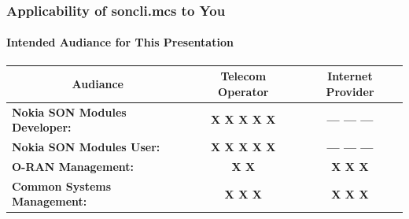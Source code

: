 \begin{whenOrg}
\begin{verblatex}

\begin{frame}[fragile,plain,label=intendedAudiance]
    \frametitle{Applicability of soncli.mcs to You}
    \framesubtitle{Intended Audiance for This Presentation}

\begin{small}
\begin{tabular}{|p{1in}|p{3in}|p{3in}|}
\hline
    \multicolumn{1}{|c|}{{\color{blue} \textbf{Audiance}}} &
    \multicolumn{1}{c|}{{\color{darkgreen} \textbf{Telecom Operator}}} &
    \multicolumn{1}{c|}{{\color{darkred} \textbf{{Internet Provider}}}} \\
\hline
\multicolumn{1}{|l|}{{\color{orange} \textbf{Nokia SON Modules Developer:}}}  &
\multicolumn{1}{c|}{{\color{darkblue} \textbf{X X X X X}}} &
\multicolumn{1}{c|}{{\color{darkblue} \textbf{--- --- ---}}} \\
\hline
\multicolumn{1}{|l|}{{\color{orange} \textbf{Nokia SON Modules User:}}}  &
\multicolumn{1}{c|}{{\color{darkblue} \textbf{X X X X X}}} &
\multicolumn{1}{c|}{{\color{darkblue} \textbf{--- --- ---}}} \\
\hline
\multicolumn{1}{|l|}{{\color{orange} \textbf{O-RAN Management:}}}  &
\multicolumn{1}{c|}{{\color{darkblue} \textbf{X X}}} &
\multicolumn{1}{c|}{{\color{darkblue} \textbf{X X X}}} \\
\hline
\multicolumn{1}{|l|}{{\color{orange} \textbf{Common Systems Management:}}}  &
\multicolumn{1}{c|}{{\color{darkblue} \textbf{X X X}}} &
\multicolumn{1}{c|}{{\color{darkblue} \textbf{X X X}}} \\
\hline
\end{tabular}
\label{tab:stepTwo}
\end{small}

\end{frame}
\end{verblatex}
\end{whenOrg}
